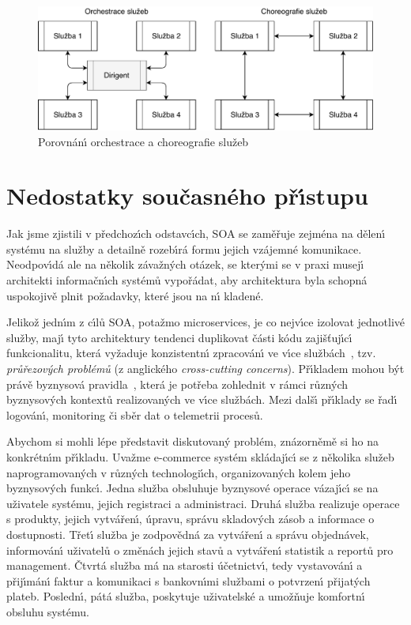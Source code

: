 \begin{figure}
    \centering
    \includegraphics[keepaspectratio=true, width=0.8\linewidth]{figures/choreography-orchestration.pdf}
    \caption{Porovnán\'{\i} orchestrace a choreografie služeb~\cite{cerny2017disambiguation}}
    \label{fig:choreography-orchestration}
\end{figure}

\section{Nedostatky současného př\'{\i}stupu}

Jak jsme zjistili v předchoz\'{\i}ch odstavc\'{\i}ch, \gls{SOA} se zaměřuje zejména na
dělen\'{\i} systému na služby a detailně rozeb\'{\i}rá formu jejich vzájemné komunikace.
Neodpov\'{\i}dá ale na několik závažn\'ych otázek, se kter\'ymi se v praxi musej\'{\i}
architekti informačn\'{\i}ch systémů vypořádat, aby architektura byla schopná uspokojivě
plnit požadavky, které jsou na n\'{\i} kladené.

Jelikož jedn\'{\i}m z c\'{\i}lů \gls{SOA}, potažmo microservices, je co nejv\'{\i}ce izolovat
jednotlivé služby, maj\'{\i} tyto architektury tendenci duplikovat části kódu
zajišťuj\'{\i}c\'{\i} funkcionalitu, která vyžaduje konzistentn\'{\i} zpracován\'{\i} ve v\'{\i}ce
službách~\cite{cerny2017disambiguation}, tzv. \textit{průřezov\'ych
problémů} (z anglického \textit{cross-cutting concerns}).
Př\'{\i}kladem mohou b\'yt právě byznysová pravidla~\cite{cemus2014aspect}, která je potřeba
zohlednit v rámci různ\'ych byznysov\'ych kontextů realizovan\'ych ve v\'{\i}ce službách.
Mezi dalš\'{\i} př\'{\i}klady se řad\'{\i} logován\'{\i}, monitoring či sběr dat
o telemetrii procesů.

Abychom si mohli lépe představit diskutovan\'y problém, znázorněmě
si ho na konkrétn\'{\i}m př\'{\i}kladu. Uvažme e-commerce systém
skládaj\'{\i}c\'{\i} se z několika služeb naprogramovan\'ych v různ\'ych technologi\'{\i}ch,
organizovan\'ych kolem jeho byznysov\'ych funkc\'{\i}.
Jedna služba obsluhuje byznysové operace vázaj\'{\i}c\'{\i}
se na uživatele systému, jejich registraci a administraci. Druhá
služba realizuje operace s produkty, jejich vytvářen\'{\i}, úpravu,
správu skladov\'ych zásob a informace o dostupnosti. Třet\'{\i} služba je
zodpovědná za vytvářen\'{\i} a správu objednávek, informován\'{\i} uživatelů
o změnách jejich stavů a vytvářen\'{\i} statistik a reportů pro management.
Čtvrtá služba má na starosti účetnictv\'{\i}, tedy vystavován\'{\i} a přij\'{\i}mán\'{\i}
faktur a komunikaci s bankovn\'{\i}mi službami o potvrzen\'{\i} přijat\'ych plateb.
Posledn\'{\i}, pátá služba, poskytuje uživatelské a umožňuje komfortn\'{\i} obsluhu systému.

